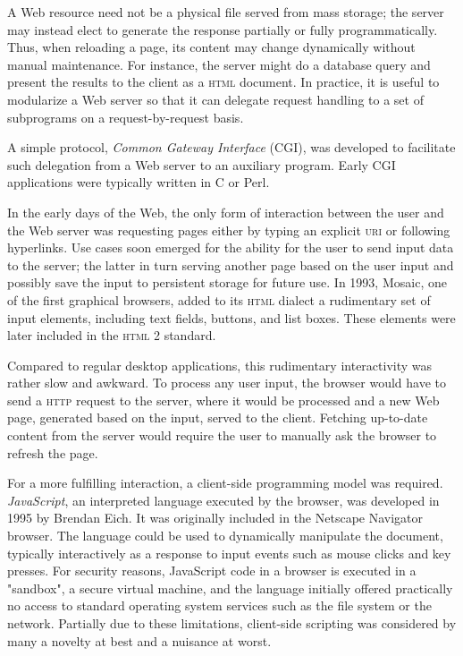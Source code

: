 A Web resource need not be a physical file served from mass storage; the server may instead elect to generate the response partially or fully programmatically. Thus, when reloading a page, its content may change dynamically without manual maintenance. For instance, the server might do a database query and present the results to the client as a \textsc{html} document. In practice, it is useful to modularize a Web server so that it can delegate request handling to a set of subprograms on a request-by-request basis. 

A simple protocol, \emph{Common Gateway Interface} (\textsc{CGI}), was developed to facilitate such delegation from a Web server to an auxiliary program. Early CGI applications were typically written in C or Perl. 

In the early days of the Web, the only form of interaction between the user and the Web server was requesting pages either by typing an explicit \textsc{uri} or following hyperlinks. Use cases soon emerged for the ability for the user to send input data to the server; the latter in turn serving another page based on the user input and possibly save the input to persistent storage for future use. In 1993, Mosaic, one of the first graphical browsers, added to its \textsc{html} dialect a rudimentary set of input elements, including text fields, buttons, and list boxes. These elements were later included in the \textsc{html} 2 standard.

Compared to regular desktop applications, this rudimentary interactivity was rather slow and awkward. To process any user input, the browser would have to send a \textsc{http} request to the server, where it would be processed and a new Web page, generated based on the input, served to the client. Fetching up-to-date content from the server would require the user to manually ask the browser to refresh the page.

For a more fulfilling interaction, a client-side programming model was required. \emph{JavaScript}, an interpreted language executed by the browser, was developed in 1995 by Brendan Eich. It was originally included in the Netscape Navigator browser. The language could be used to dynamically manipulate the document, typically interactively as a response to input events such as mouse clicks and key presses. For security reasons, JavaScript code in a browser is executed in a "sandbox", a secure virtual machine, and the language initially offered practically no access to standard operating system services such as the file system or the network. Partially due to these limitations, client-side scripting was considered by many a novelty at best and a nuisance at worst.

